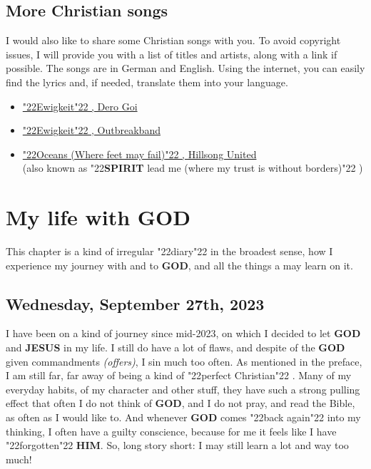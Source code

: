 \documentclass[10pt,a5paper]{article}
\newcommand{\God}[0]{\textbf{GOD}}
\newcommand{\Him}[0]{\textbf{HIM}}
\newcommand{\Jesus}[0]{\textbf{JESUS}}
\newcommand{\Spirit}[0]{\textbf{SPIRIT}}
\newcommand{\q}[1]{\char"22{#1}\char"22 }
\begin{document}
	\subsection{More Christian songs}
		I would also like to share some Christian songs with you.
		To avoid copyright issues,
		I will provide you with a list of titles and artists,
		along with a link if possible.
		The songs are in German and English.
		Using the internet,
		you can easily find the lyrics and,
		if needed,
		translate them into your language.
		\begin{itemize}[noitemsep]
			\item	\href{https://www.youtube.com/watch?v=Oncj9JBo1xQ}{\q{Ewigkeit},
					Dero Goi}
			\item	\href{https://www.youtube.com/watch?v=PcxaUHkmnSQ}{\q{Ewigkeit},
					Outbreakband}
			\item	\href{https://www.youtube.com/watch?v=DqlpyrHB_Qk}{\q{Oceans (Where feet may fail)},
					Hillsong United}
					\\
					(also known as \q{{\Spirit} lead me (where my trust is without borders)})
		\end{itemize}
		
		
		
	\newpage
	\section{My life with {\God}} \label{MeinLebenMitGott}
		This chapter is a kind of irregular \q{diary} in the broadest sense,
		how I experience my journey with and to {\God},
		and all the things a may learn on it.
	
	\subsection{Wednesday, September 27th, 2023}
		I have been on a kind of journey since mid-2023,
		on which I decided to let {\God} and {\Jesus} in my life.
		I still do have a lot of flaws,
		and despite of the {\God} given commandments \textit{(offers)},
		I sin much too often.
		As mentioned in the preface,
		I am still far,
		far away of being a kind of \q{perfect Christian}.
		Many of my everyday habits,
		of my character and other stuff,
		they have such a strong pulling effect
		that often I do not think of {\God},
		and I do not pray,
		and read the Bible,
		as often as I would like to.
		And whenever {\God} comes \q{back again} into my thinking,
		I often have a guilty conscience,
		because for me it feels like I have \q{forgotten} {\Him}.
		So,
		long story short:
		I may still learn a lot and way too much!
\end{document}

